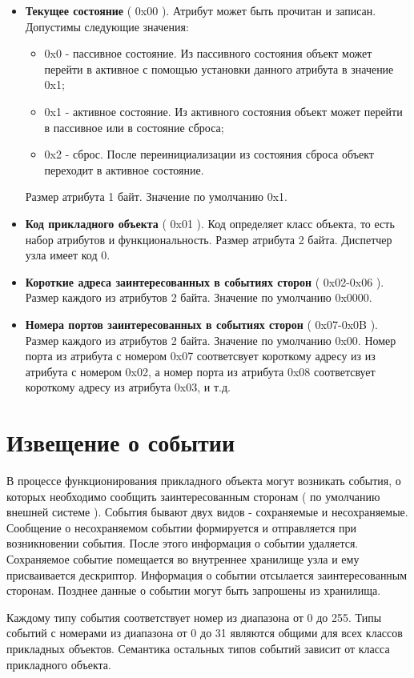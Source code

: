 \begin{itemize}
\item {\bfseries Текущее состояние} ( 0x00 ). Атрибут может быть прочитан и записан. Допустимы следующие значения:
    \begin{itemize}
        \item 0x0 - пассивное состояние. Из пассивного состояния объект может перейти в активное с помощью установки данного
        атрибута в значение 0x1;
        \item 0x1 - активное состояние. Из активного состояния объект может перейти в пассивное или в состояние сброса;
        \item 0x2 - сброс. После переинициализации из состояния сброса объект переходит в активное состояние.
    \end{itemize}
Размер атрибута 1 байт. Значение по умолчанию 0x1. 
\item {\bfseries Код прикладного объекта} ( 0x01 ). Код определяет класс объекта, то есть набор атрибутов и функциональность.
Размер атрибута 2 байта. Диспетчер узла имеет код 0.
\item {\bfseries Короткие адреса заинтересованных в событиях сторон} ( 0x02-0x06 ). Размер каждого из атрибутов 2 байта. Значение по
умолчанию 0x0000.
\item {\bfseries Номера портов заинтересованных в событиях сторон} ( 0x07-0x0B ). Размер каждого из атрибутов 2 байта. 
Значение по умолчанию 0x00. Номер порта из атрибута с номером 0x07 соответсвует короткому адресу из из атрибута с номером 0x02,
а номер порта из атрибута 0x08 соответсвует короткому адресу из атрибута 0x03, и т.д.
\end{itemize}

\section{Извещение о событии}
    В процессе функционирования прикладного объекта могут возникать события, о которых
необходимо сообщить заинтересованным сторонам ( по умолчанию внешней системе ). События
бывают двух видов - сохраняемые и несохраняемые. Сообщение о несохраняемом событии формируется
и отправляется при возникновении события. После этого информация о событии удаляется. 
Сохраняемое событие помещается во внутреннее хранилище узла и ему присваивается дескриптор.
Информация о событии отсылается заинтересованным сторонам. Позднее данные о событии могут быть
запрошены из хранилища. 

    Каждому типу события соответствует номер из диапазона от 0 до 255. Типы событий с номерами
из диапазона от 0 до 31 являются общими для всех классов прикладных объектов. Семантика остальных
типов событий зависит от класса прикладного объекта.

